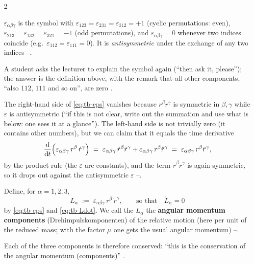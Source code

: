 \begin{paracol}{2}
\begin{definition}\label{def:tb-eps}
$\varepsilon_{\alpha\beta\gamma}$ is the symbol with $\varepsilon_{123}=\varepsilon_{231}=\varepsilon_{312}=+1$ (cyclic permutations: even), $\varepsilon_{213}=\varepsilon_{132}=\varepsilon_{321}=-1$ (odd permutations), and $\varepsilon_{\alpha\beta\gamma}=0$ whenever two indices coincide (e.g.\ $\varepsilon_{112}=\varepsilon_{111}=0$). It is \emph{antisymmetric} under the exchange of any two indices --.
\end{definition}
\begin{coursenote}\label{cn:tb-epsq}
A student asks the lecturer to explain the symbol again (``then ask it, please''); the answer is the definition above, with the remark that all other components, ``also $112$, $111$ and so on'', are zero .
\end{coursenote}
The right-hand side of \eqref{eq:tb-eps} vanishes because $r^\beta r^\gamma$ is symmetric in $\beta,\gamma$ while $\varepsilon$ is antisymmetric (``if this is not clear, write out the summation and use what is below: one sees it at a glance''). The left-hand side is not trivially zero (it contains other numbers), but we can claim that it equals the time derivative
\begin{equation}\label{eq:tb-Ldot}
  \frac{\mathrm d}{\mathrm dt}\Bigl(\varepsilon_{\alpha\beta\gamma}\,r^\beta\,\dot r^\gamma\Bigr)\;=\;\varepsilon_{\alpha\beta\gamma}\,\dot r^\beta\dot r^\gamma+\varepsilon_{\alpha\beta\gamma}\,r^\beta\ddot r^\gamma\;=\;\varepsilon_{\alpha\beta\gamma}\,r^\beta\ddot r^\gamma ,
\end{equation}
by the product rule (the $\varepsilon$ are constants), and the term $\dot r^\beta\dot r^\gamma$ is again symmetric, so it drops out against the antisymmetric $\varepsilon$ --.

\begin{definition}\label{def:tb-L}
Define, for $\alpha=1,2,3$,
\begin{equation}\label{eq:tb-L}
  L_\alpha\;:=\;\varepsilon_{\alpha\beta\gamma}\,r^\beta\,\dot r^\gamma ,\qquad\text{so that}\quad \dot L_\alpha=0
\end{equation}
by \eqref{eq:tb-eps} and \eqref{eq:tb-Ldot}. We call the $L_\alpha$ the \textbf{angular momentum components} (Drehimpulskomponenten) of the relative motion (here per unit of the reduced mass; with the factor $\mu$ one gets the usual angular momentum) --.
\end{definition}
Each of the three components is therefore conserved: ``this is the conservation of the angular momentum (components)'' .


\end{paracol}
